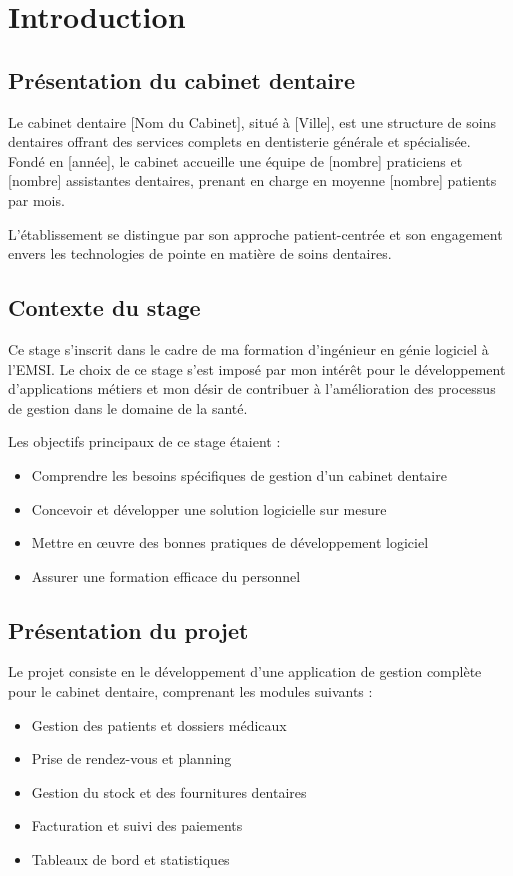 \documentclass[12pt,a4paper]{report}
\begin{document}
\chapter{Introduction}
\section{Présentation du cabinet dentaire}
Le cabinet dentaire [Nom du Cabinet], situé à [Ville], est une structure de soins dentaires offrant des services complets en dentisterie générale et spécialisée. Fondé en [année], le cabinet accueille une équipe de [nombre] praticiens et [nombre] assistantes dentaires, prenant en charge en moyenne [nombre] patients par mois.\par

L'établissement se distingue par son approche patient-centrée et son engagement envers les technologies de pointe en matière de soins dentaires.

\section{Contexte du stage}
Ce stage s'inscrit dans le cadre de ma formation d'ingénieur en génie logiciel à l'EMSI. Le choix de ce stage s'est imposé par mon intérêt pour le développement d'applications métiers et mon désir de contribuer à l'amélioration des processus de gestion dans le domaine de la santé.\par

Les objectifs principaux de ce stage étaient :
\begin{itemize}
    \item Comprendre les besoins spécifiques de gestion d'un cabinet dentaire
    \item Concevoir et développer une solution logicielle sur mesure
    \item Mettre en œuvre des bonnes pratiques de développement logiciel
    \item Assurer une formation efficace du personnel
\end{itemize}

\section{Présentation du projet}
Le projet consiste en le développement d'une application de gestion complète pour le cabinet dentaire, comprenant les modules suivants :
\begin{itemize}
    \item Gestion des patients et dossiers médicaux
    \item Prise de rendez-vous et planning
    \item Gestion du stock et des fournitures dentaires
    \item Facturation et suivi des paiements
    \item Tableaux de bord et statistiques
\end{itemize}
\end{document}
